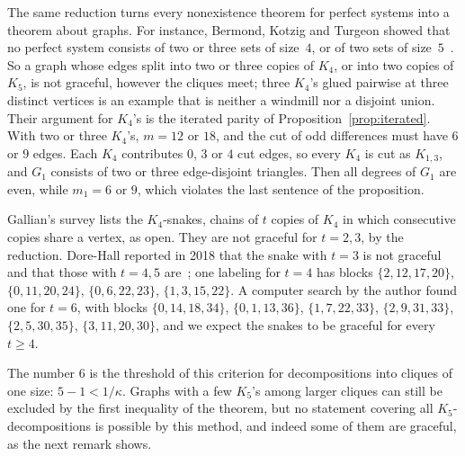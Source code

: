 \documentclass[11pt]{amsart}
\theoremstyle{tplain}
\theoremstyle{tdefinition}
\theoremstyle{tremark}
\begin{document}
The same reduction turns every nonexistence theorem for perfect systems into
a theorem about graphs. For instance, Bermond, Kotzig and Turgeon showed that
no perfect system consists of two or three sets of size~$4$, or of two sets
of size~$5$~\cite{bkt}. So a graph whose edges split into two or three
copies of $K_4$, or into two copies of $K_5$, is not graceful, however the
cliques meet; three $K_4$'s glued pairwise at three distinct vertices is an
example that is neither a windmill nor a disjoint union. Their argument for
$K_4$'s is the iterated parity of Proposition~\ref{prop:iterated}. With two
or three $K_4$'s, $m=12$ or $18$, and the cut of odd differences must have $6$
or $9$ edges. Each $K_4$ contributes $0$, $3$ or $4$ cut edges, so every $K_4$
is cut as $K_{1,3}$, and $G_1$ consists of two or three edge-disjoint
triangles. Then all degrees of $G_1$ are even, while $m_1=6$ or $9$, which
violates the last sentence of the proposition.

Gallian's survey lists the $K_4$-snakes, chains of $t$ copies of
$K_4$ in which consecutive copies share a vertex, as open. They are not
graceful for $t=2,3$, by the reduction. Dore-Hall reported in 2018 that the
snake with $t=3$ is not graceful and that those with $t=4,5$
are~\cite{dorehall}; one labeling for $t=4$ has blocks $\{2,12,17,20\}$,
$\{0,11,20,24\}$, $\{0,6,22,23\}$, $\{1,3,15,22\}$. A computer search by
the author found one for $t=6$, with blocks $\{0,14,18,34\}$,
$\{0,1,13,36\}$, $\{1,7,22,33\}$, $\{2,9,31,33\}$, $\{2,5,30,35\}$,
$\{3,11,20,30\}$, and we expect the snakes to be graceful for every $t\ge4$.

The number $6$ is the threshold of this criterion for decompositions into
cliques of one size: $5-1<1/\kappa$. Graphs with a few $K_5$'s among larger
cliques can still be excluded by the first inequality of the theorem, but no
statement covering all $K_5$-decompositions is possible by this method, and
indeed some of them are graceful, as the next remark shows.
\end{document}

